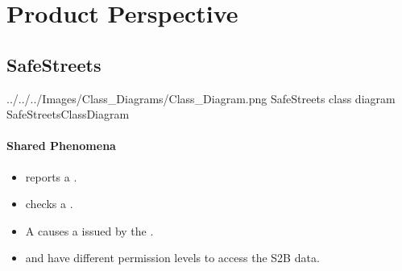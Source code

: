 \documentclass[../../rasd.tex]{subfiles}
\begin{document}
	
	\section{Product Perspective}
	\subsection{SafeStreets\label{sect:2.1.1}}
	
	\image {10cm} {../../../Images/Class_Diagrams/Class_Diagram.png} {SafeStreets class diagram} {SafeStreetsClassDiagram}
	
	\paragraph{Shared Phenomena}
	\begin{itemize}
		\item {} reports a .
		\item {} checks a .
		\item A  causes a  issued by the .
		\item {} and  have different permission levels to access the S2B data.
	\end{itemize}
		
\end{document}
